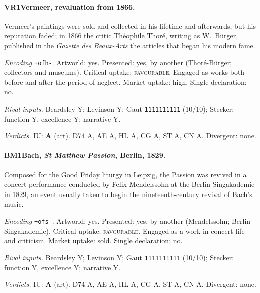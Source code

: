 \paragraph{VR1\enspace Vermeer, revaluation from 1866.}
Vermeer's paintings were sold and collected in his lifetime and afterwards, but his reputation faded; in 1866 the critic Th\'eophile Thor\'e, writing as W.~B\"urger, published in the \emph{Gazette des Beaux-Arts} the articles that began his modern fame.\par
\noindent\textit{Encoding} \texttt{+ofh-}. Artworld: yes. Presented: yes, by another (Thor\'e-B\"urger; collectors and museums). Critical uptake: \textsc{favourable}. Engaged as works both before and after the period of neglect. Market uptake: high. Single declaration: no.\par
\noindent\textit{Rival inputs.} Beardsley Y; Levinson Y; Gaut \texttt{1111111111} (10/10); Stecker: function Y, excellence Y; narrative Y.\par
\noindent\textit{Verdicts.} IU: \textbf{A} (art). D74 A, AE A, HL A, CG A, ST A, CN A. Divergent: none.\par

\paragraph{BM1\enspace Bach, \emph{St Matthew Passion}, Berlin, 1829.}
Composed for the Good Friday liturgy in Leipzig, the Passion was revived in a concert performance conducted by Felix Mendelssohn at the Berlin Singakademie in 1829, an event usually taken to begin the nineteenth-century revival of Bach's music.\par
\noindent\textit{Encoding} \texttt{+ofs-}. Artworld: yes. Presented: yes, by another (Mendelssohn; Berlin Singakademie). Critical uptake: \textsc{favourable}. Engaged as a work in concert life and criticism. Market uptake: sold. Single declaration: no.\par
\noindent\textit{Rival inputs.} Beardsley Y; Levinson Y; Gaut \texttt{1111111111} (10/10); Stecker: function Y, excellence Y; narrative Y.\par
\noindent\textit{Verdicts.} IU: \textbf{A} (art). D74 A, AE A, HL A, CG A, ST A, CN A. Divergent: none.\par

